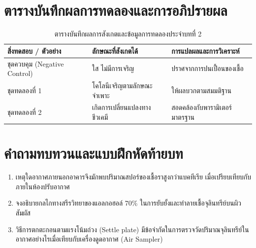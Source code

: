 \section{ตารางบันทึกผลการทดลองและการอภิปรายผล}
\begin{table}[H]
\centering\small
\caption{ตารางบันทึกผลการสังเกตและข้อมูลการทดลองประจำบทที่ 2}
\label{tab:ch02_datasheet}
\begin{tabularx}{\textwidth}{p{} p{} X}
\toprule
\textbf{สิ่งทดสอบ / ตัวอย่าง} & \textbf{ลักษณะที่สังเกตได้} & \textbf{การแปลผลและการวิเคราะห์} \\
\midrule
ชุดควบคุม (Negative Control) & ใส ไม่มีการเจริญ & ปราศจากการปนเปื้อนของเชื้อ \\
ชุดทดลองที่ 1 & โคโลนีเจริญตามลักษณะจำเพาะ & ให้ผลบวกตามสมมติฐาน \\
ชุดทดลองที่ 2 & เกิดการเปลี่ยนแปลงทางชีวเคมี & สอดคล้องกับพารามิเตอร์มาตรฐาน \\
\bottomrule
\end{tabularx}
\end{table}

\section{คำถามทบทวนและแบบฝึกหัดท้ายบท}
\begin{enumerate}
    \item เหตุใดอากาศภายนอกอาคารจึงมักพบปริมาณสปอร์ของเชื้อราสูงกว่าแบคทีเรีย เมื่อเปรียบเทียบกับภายในห้องปรับอากาศ
    \item จงอธิบายกลไกทางสรีรวิทยาของแอลกอฮอล์ 70\% ในการยับยั้งและทำลายเชื้อจุลินทรีย์บนผิวสัมผัส
    \item วิธีการตกตะกอนตามแรงโน้มถ่วง (Settle plate) มีข้อจำกัดในการตรวจวัดปริมาณจุลินทรีย์ในอากาศอย่างไรเมื่อเทียบกับเครื่องดูดอากาศ (Air Sampler)
\end{enumerate}
